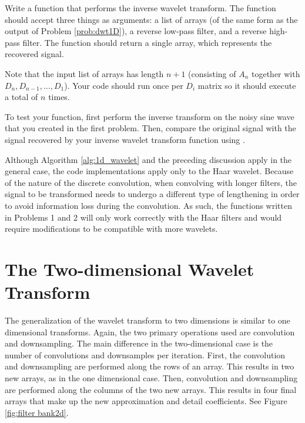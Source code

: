 \begin{problem} %
Write a function that performs the inverse wavelet transform.
The function should accept three things as arguments: a list of arrays (of the same form as the output of Problem \ref{prob:dwt1D}), a reverse low-pass filter, and a reverse high-pass filter.
The function should return a single array, which represents the recovered signal.

Note that the input list of arrays has length $n+1$ (consisting of $A_n$ together with $D_n, D_{n-1}, \ldots, D_1$). Your code should run once per $D_i$ matrix so it should execute a total of $n$ times.

To test your function, first perform the inverse transform on the noisy sine wave that you created in the first problem.
Then, compare the original signal with the signal recovered by your inverse wavelet transform function using .
\end{problem}

\begin{warn}
Although Algorithm \ref{alg:1d_wavelet} and the preceding discussion apply in the general case, the code implementations apply only to the Haar wavelet.
Because of the nature of the discrete convolution, when convolving with longer filters, the signal to be transformed needs to undergo a different type of lengthening in order to avoid
information loss during the convolution.
As such, the functions written in Problems 1 and 2 will only work correctly with the Haar filters and would require modifications to be compatible with more wavelets.
\end{warn}



\section*{The Two-dimensional Wavelet Transform} %

The generalization of the wavelet transform to two dimensions is similar to one dimensional transforms.
Again, the two primary operations used are convolution and downsampling.
The main difference in the two-dimensional case is the number of convolutions and downsamples per iteration.
First, the convolution and downsampling are performed along the rows of an array.
This results in two new arrays, as in the one dimensional case.
Then, convolution and downsampling are performed along the columns of the two new arrays.
This results in four final arrays that make up the new approximation and detail coefficients.
See Figure \ref{fig:filter bank2d}.

